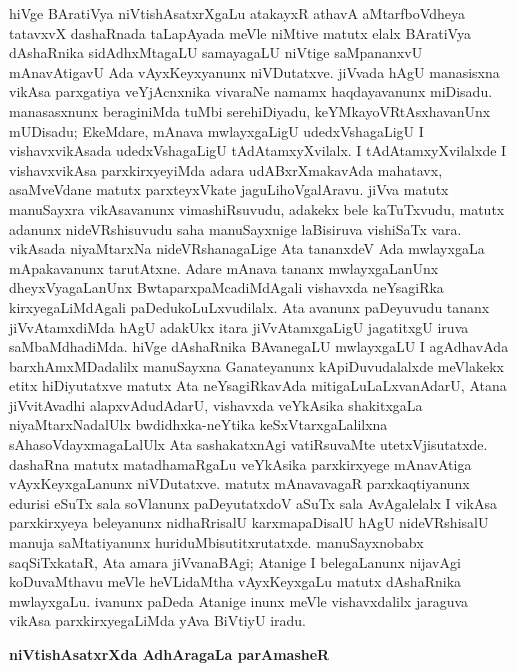 hiVge BAratiVya niVtishAsatxrXgaLu atakayxR athavA aMtarfboVdheya tatavxvX dashaRnada taLapAyada meVle niMtive matutx elalx BAratiVya dAshaRnika sidAdhxMtagaLU samayagaLU niVtige saMpananxvU mAnavAtigavU Ada vAyxKeyxyanunx niVDutatxve. jiVvada hAgU manasisxna vikAsa parxgatiya veYjAcnxnika vivaraNe namamx haqdayavanunx miDisadu. manasasxnunx beraginiMda tuMbi serehiDiyadu, keYMkayoVRtAsxhavanUnx mUDisadu; EkeMdare, mAnava mwlayxgaLigU udedxVshagaLigU I vishavxvikAsada udedxVshagaLigU tAdAtamxyXvilalx. I tAdAtamxyXvilalxde I vishavxvikAsa parxkirxyeyiMda adara udABxrXmakavAda mahatavx, asaMveVdane matutx parxteyxVkate jaguLihoVgalAravu. jiVva matutx manuSayxra vikAsavanunx vimashiRsuvudu, adakekx bele kaTuTxvudu, matutx adanunx nideVRshisuvudu saha manuSayxnige laBisiruva vishiSaTx vara. vikAsada niyaMtarxNa nideVRshanagaLige Ata tananxdeV Ada mwlayxgaLa mApakavanunx tarutAtxne. Adare mAnava tananx mwlayxgaLanUnx dheyxVyagaLanUnx BwtaparxpaMcadiMdAgali vishavxda neYsagiRka kirxyegaLiMdAgali paDedukoLuLxvudilalx. Ata avanunx paDeyuvudu tananx jiVvAtamxdiMda hAgU adakUkx itara jiVvAtamxgaLigU jagatitxgU iruva saMbaMdhadiMda. hiVge dAshaRnika BAvanegaLU mwlayxgaLU I agAdhavAda barxhAmxMDadalilx manuSayxna Ganateyanunx kApiDuvudalalxde meVlakekx etitx hiDiyutatxve matutx Ata neYsagiRkavAda mitigaLuLaLxvanAdarU, Atana jiVvitAvadhi alapxvAdudAdarU, vishavxda veYkAsika shakitxgaLa niyaMtarxNadalUlx bwdidhxka-neYtika keSxVtarxgaLalilxna sAhasoVdayxmagaLalUlx Ata sashakatxnAgi vatiRsuvaMte utetxVjisutatxde. dashaRna matutx matadhamaRgaLu veYkAsika parxkirxyege mAnavAtiga vAyxKeyxgaLanunx niVDutatxve. matutx mAnavavagaR parxkaqtiyanunx edurisi eSuTx sala soVlanunx paDeyutatxdoV aSuTx sala AvAgalelalx I vikAsa parxkirxyeya beleyanunx nidhaRrisalU karxmapaDisalU hAgU nideVRshisalU manuja saMtatiyanunx huriduMbisutitxrutatxde. manuSayxnobabx saqSiTxkataR, Ata amara jiVvanaBAgi; Atanige I belegaLanunx nijavAgi koDuvaMthavu meVle heVLidaMtha vAyxKeyxgaLu matutx dAshaRnika mwlayxgaLu. ivanunx paDeda Atanige inunx meVle vishavxdalilx jaraguva vikAsa parxkirxyegaLiMda yAva BiVtiyU iradu.

\smallskip
\begin{center}
{\Large\bf niVtishAsatxrXda AdhAragaLa parAmasheR}
\end{center}

